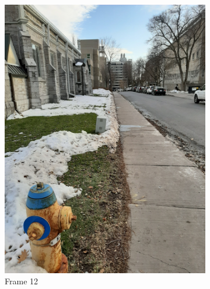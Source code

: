 \documentclass[conference]{IEEEtran}
\begin{document}
\begin{figure}[!h]
\begin{subfigure}[b]{0.2\linewidth}
    \includegraphics[width=\linewidth, angle = -90]{images/frame12.jpg}
    \caption{Frame 12}
  \end{subfigure}
  \begin{subfigure}[b]{0.2\linewidth}

\end{subfigure}
\end{figure}
\end{document}
